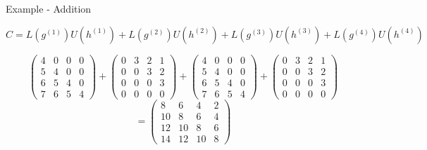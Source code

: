 \begin{frame}{Example - Addition}

  \[
    C = L(g^{(1)})U(h^{(1)}) + L(g^{(2)})U(h^{(2)})
    +L(g^{(3)})U(h^{(3)}) + L(g^{(4)})U(h^{(4)})
  \]

  \vspace{0.5em}

  \[
    \begin{pmatrix}
      4 & 0 & 0 & 0 \\
      5 & 4 & 0 & 0 \\
      6 & 5 & 4 & 0 \\
      7 & 6 & 5 & 4
    \end{pmatrix} +
    \begin{pmatrix}
      0 & 3 & 2 & 1 \\
      0 & 0 & 3 & 2 \\
      0 & 0 & 0 & 3 \\
      0 & 0 & 0 & 0
    \end{pmatrix}+
    \begin{pmatrix}
      4 & 0 & 0 & 0 \\
      5 & 4 & 0 & 0 \\
      6 & 5 & 4 & 0 \\
      7 & 6 & 5 & 4
    \end{pmatrix} +
    \begin{pmatrix}
      0 & 3 & 2 & 1 \\
      0 & 0 & 3 & 2 \\
      0 & 0 & 0 & 3 \\
      0 & 0 & 0 & 0
    \end{pmatrix}
  \]
  \[
    =
    \begin{pmatrix}
      8 & 6 & 4 & 2 \\
      10 & 8 & 6 & 4 \\
      12 & 10 & 8 & 6 \\
      14 & 12 & 10 & 8
    \end{pmatrix}
  \]


\end{frame}
